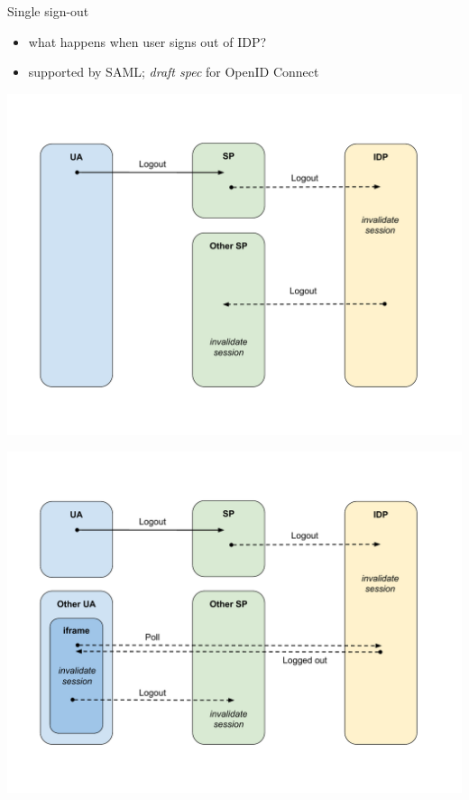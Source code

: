 \documentclass[ignorenonframetext,aspectratio=169]{beamer}
\providecommand{\tightlist}{%
  \setlength{\itemsep}{0pt}\setlength{\parskip}{0pt}}
\begin{document}
\begin{frame}{Single sign-out}
\begin{itemize}
\tightlist
\item what happens when user signs out of IDP?
\item supported by SAML; {\em draft spec} for OpenID Connect
\end{itemize}
\end{frame}

\begin{frame}[plain]
\centering
\includegraphics[height=\paperheight]{fedsso-logout-backchannel.pdf}
\end{frame}

\begin{frame}[plain]
\centering
\includegraphics[height=\paperheight]{fedsso-logout-frontchannel.pdf}
\end{frame}
\end{document}
